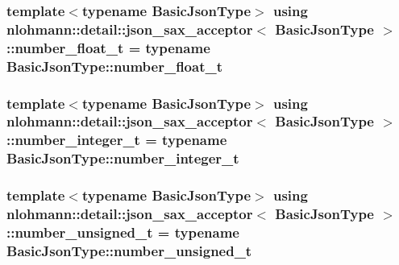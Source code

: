 \subsubsection[{\texorpdfstring{number\+\_\+float\+\_\+t}{number_float_t}}]{\setlength{\rightskip}{0pt plus 5cm}template$<$typename Basic\+Json\+Type$>$ using {\bf nlohmann\+::detail\+::json\+\_\+sax\+\_\+acceptor}$<$ Basic\+Json\+Type $>$\+::{\bf number\+\_\+float\+\_\+t} =  typename Basic\+Json\+Type\+::number\+\_\+float\+\_\+t}\hypertarget{classnlohmann_1_1detail_1_1json__sax__acceptor_a5502f483fc60a1bcd73e0e46b6ab36e4}{}\label{classnlohmann_1_1detail_1_1json__sax__acceptor_a5502f483fc60a1bcd73e0e46b6ab36e4}
\subsubsection[{\texorpdfstring{number\+\_\+integer\+\_\+t}{number_integer_t}}]{\setlength{\rightskip}{0pt plus 5cm}template$<$typename Basic\+Json\+Type$>$ using {\bf nlohmann\+::detail\+::json\+\_\+sax\+\_\+acceptor}$<$ Basic\+Json\+Type $>$\+::{\bf number\+\_\+integer\+\_\+t} =  typename Basic\+Json\+Type\+::number\+\_\+integer\+\_\+t}\hypertarget{classnlohmann_1_1detail_1_1json__sax__acceptor_a41876b17c0e8bdb55580eaf5e4e2ded8}{}\label{classnlohmann_1_1detail_1_1json__sax__acceptor_a41876b17c0e8bdb55580eaf5e4e2ded8}
\subsubsection[{\texorpdfstring{number\+\_\+unsigned\+\_\+t}{number_unsigned_t}}]{\setlength{\rightskip}{0pt plus 5cm}template$<$typename Basic\+Json\+Type$>$ using {\bf nlohmann\+::detail\+::json\+\_\+sax\+\_\+acceptor}$<$ Basic\+Json\+Type $>$\+::{\bf number\+\_\+unsigned\+\_\+t} =  typename Basic\+Json\+Type\+::number\+\_\+unsigned\+\_\+t}\hypertarget{classnlohmann_1_1detail_1_1json__sax__acceptor_ae07454608ea6f3cfb765f95e3c850043}{}\label{classnlohmann_1_1detail_1_1json__sax__acceptor_ae07454608ea6f3cfb765f95e3c850043}
